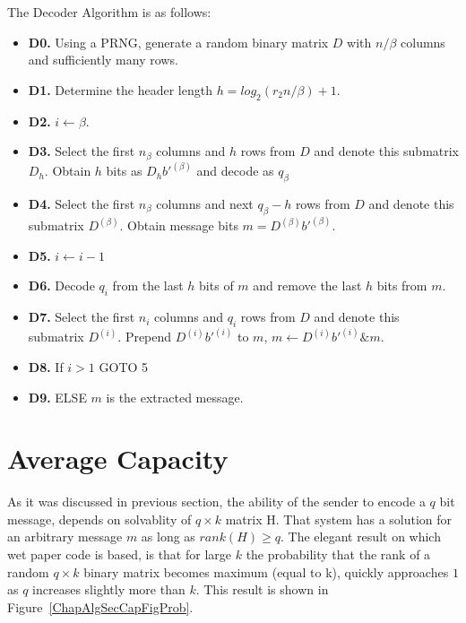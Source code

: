 The Decoder Algorithm is as follows:

\begin{itemize}

\item {\bf D0.} Using a PRNG, generate a random binary matrix $D$ with $n/\beta$ columns and sufficiently many rows.

\item {\bf D1.} Determine the header length $h=log_2(r_2n/\beta)+1$.

\item {\bf D2.} $i\leftarrow\beta$.

\item {\bf D3.} Select the first $n_\beta$ columns and $h$ rows from $D$ and denote this submatrix $D_h$. Obtain $h$ bits as $D_hb'^{(\beta)}$ and decode as $q_\beta$

\item {\bf D4.} Select the first $n_\beta$ columns and next $q_\beta - h$ rows from $D$ and denote this submatrix $D^{(\beta)}$. Obtain message bits $m=D^{(\beta)}b'^{(\beta)}$.

\item {\bf D5.} $i\leftarrow i - 1$

\item {\bf D6.} Decode $q_i$ from the last $h$ bits of $m$ and remove the last $h$ bits from $m$.

\item {\bf D7.} Select the first $n_i$ columns and $q_i$ rows from $D$ and denote this submatrix $D^{(i)}$. Prepend $D^{(i)}b'^{(i)}$ to $m$, $m \leftarrow D^{(i)}b'^{(i)}\& m$.

\item {\bf D8.} If $i > 1$ GOTO 5
\item {\bf D9.} ELSE $m$ is the extracted message.

\end{itemize}

\section{Average Capacity}

As it was discussed in previous section, the ability of the sender to encode a $q$ bit message, depends on solvablity of $q\times k$ matrix H. That system has a solution for an arbitrary message $m$ as long as $rank(H) \geq q$. The elegant result on which wet paper code is based, is that for large $k$ the probability that the rank of a random $q \times k$ binary matrix becomes maximum (equal to k), quickly approaches $1$ as $q$ increases slightly more than $k$. This result is shown in Figure~\ref{ChapAlgSecCapFigProb}.

